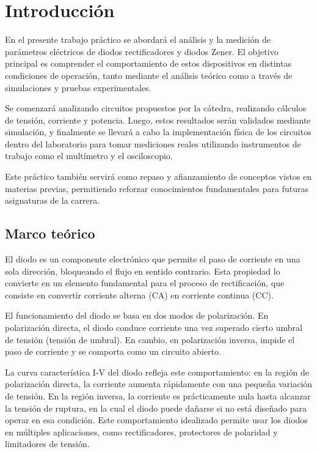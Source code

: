 \chapter{Introducción}

En el presente trabajo práctico se abordará el análisis y la medición de parámetros eléctricos de diodos rectificadores y diodos Zener. El objetivo principal es comprender el comportamiento de estos dispositivos en distintas condiciones de operación, tanto mediante el análisis teórico como a través de simulaciones y pruebas experimentales.

Se comenzará analizando circuitos propuestos por la cátedra, realizando cálculos de tensión, corriente y potencia. Luego, estos resultados serán validados mediante simulación, y finalmente se llevará a cabo la implementación física de los circuitos dentro del laboratorio para tomar mediciones reales utilizando instrumentos de trabajo como el multímetro y el osciloscopio.

Este práctico también servirá como repaso y afianzamiento de conceptos vistos en materias previas, permitiendo reforzar conocimientos fundamentales para futuras asignaturas de la carrera.

\section{Marco teórico}

El diodo es un componente electrónico que permite el paso de corriente en una sola dirección, bloqueando el flujo en sentido contrario. Esta propiedad lo convierte en un elemento fundamental para el proceso de rectificación, que consiste en convertir corriente alterna (CA) en corriente continua (CC).

El funcionamiento del diodo se basa en dos modos de polarización. En polarización directa, el diodo conduce corriente una vez superado cierto umbral de tensión (tensión de umbral). En cambio, en polarización inversa, impide el paso de corriente y se comporta como un circuito abierto.

La curva característica I-V del diodo refleja este comportamiento: en la región de polarización directa, la corriente aumenta rápidamente con una pequeña variación de tensión. En la región inversa, la corriente es prácticamente nula hasta alcanzar la tensión de ruptura, en la cual el diodo puede dañarse si no está diseñado para operar en esa condición.
Este comportamiento idealizado permite usar los diodos en múltiples aplicaciones, como rectificadores, protectores de polaridad y limitadores de tensión.

